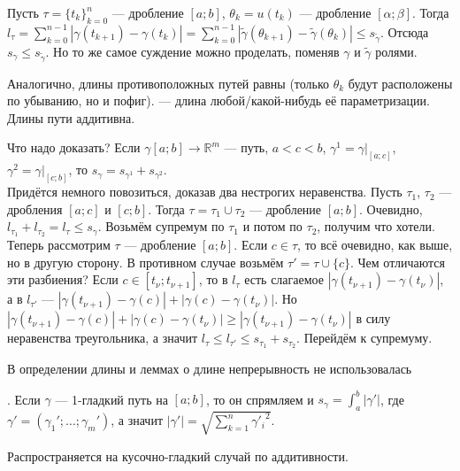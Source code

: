 \documentclass{article}
\begin{document}
\begin{itemize}
\begin{Proof}
            Пусть $\tau=\{t_k\}_{k=0}^{n}$ --- дробление $[a;b]$, $\theta_k=u(t_k)$ --- дробление $[\alpha;\beta]$. Тогда $l_\tau=\sum\limits_{k=0}^{n-1}|\gamma(t_{k+1})-\gamma(t_k)|=\sum\limits_{k=0}^{n-1}|\tilde\gamma(\theta_{k+1})-\tilde\gamma(\theta_k)|\leqslant s_{\tilde\gamma}$. Отсюда $s_\gamma\leqslant s_{\tilde\gamma}$. Но то же самое суждение можно проделать, поменяв $\gamma$ и $\tilde\gamma$ ролями.
        \end{Proof}
        \thm Аналогично, длины противоположных путей равны (только $\theta_k$ будут расположены по убыванию, но и пофиг).
        \dfn {} --- длина любой/какой-нибудь её параметризации.
        \thm Длины пути аддитивна.
        \begin{Proof}
            Что надо доказать? Если $\gamma[a;b]\to\mathbb R^m$ --- путь, $a<c<b$, $\gamma^1=\gamma\big|_{[a;c]}$, $\gamma^2=\gamma\big|_{[c;b]}$, то $s_\gamma=s_{\gamma^1}+s_{\gamma^2}$.\\
            Придётся немного повозиться, доказав два нестрогих неравенства. Пусть $\tau_1$, $\tau_2$ --- дробления $[a;c]$ и $[c;b]$. Тогда $\tau=\tau_1\cup\tau_2$ --- дробление $[a;b]$. Очевидно, $l_{\tau_1}+l_{\tau_2}=l_\tau\leqslant s_\gamma$. Возьмём супремум по $\tau_1$ и потом по $\tau_2$, получим что хотели.\\
            Теперь рассмотрим $\tau$ --- дробление $[a;b]$. Если $c\in\tau$, то всё очевидно, как выше, но в другую сторону. В противном случае возьмём $\tau'=\tau\cup\{c\}$. Чем отличаются эти разбиения? Если $c\in[t_\nu;t_{\nu+1}]$, то в $l_\tau$ есть слагаемое $|\gamma(t_{\nu+1})-\gamma(t_\nu)|$, а в $l_{\tau'}$ --- $|\gamma(t_{\nu+1})-\gamma(c)|+|\gamma(c)-\gamma(t_\nu)|$. Но $|\gamma(t_{\nu+1})-\gamma(c)|+|\gamma(c)-\gamma(t_\nu)|\geqslant|\gamma(t_{\nu+1})-\gamma(t_\nu)|$ в силу неравенства треугольника, а значит $l_\tau\leqslant l_{\tau'}\leqslant s_{\tau_1}+s_{\tau_2}$. Перейдём к супремуму.
        \end{Proof}
        \begin{Comment}
            В определении длины и леммах о длине непрерывность не использовалась
        \end{Comment}
        \thm {}. Если $\gamma$ --- 1-гладкий путь на $[a;b]$, то он спрямляем и $s_\gamma=\int_a^b|\gamma'|$, где $\gamma'=(\gamma_1';\ldots;\gamma_m')$, а значит $|\gamma'|=\sqrt{\sum\limits_{k=1}^n{\gamma'_i}^2}$.
        \begin{Comment}
            Распространяется на кусочно-гладкий случай по аддитивности.

\end{Comment}
\end{itemize}
\end{document}
